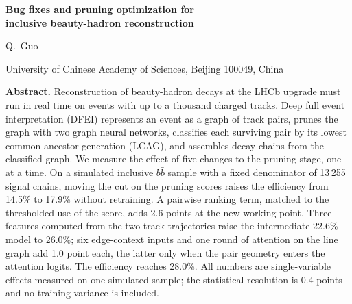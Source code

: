 \documentclass[10pt]{article}
\begin{document}
\begin{center}
{\LARGE\bfseries Bug fixes and pruning optimization for\\[2pt] inclusive beauty-hadron reconstruction\par}
\vspace{0.9em}
{\large Q.~Guo\par}
\vspace{0.35em}
{\small University of Chinese Academy of Sciences, Beijing 100049, China\par}
\end{center}

\vspace{0.3em}
\begin{center}
\begin{minipage}{0.86\textwidth}
\textbf{Abstract.} Reconstruction of beauty-hadron decays at the LHCb upgrade must run in real time on events with up to a thousand charged tracks. Deep full event interpretation (DFEI) represents an event as a graph of track pairs, prunes the graph with two graph neural networks, classifies each surviving pair by its lowest common ancestor generation (LCAG), and assembles decay chains from the classified graph. We measure the effect of five changes to the pruning stage, one at a time. On a simulated inclusive $b\bar b$ sample with a fixed denominator of 13\,255 signal chains, moving the cut on the pruning scores raises the efficiency from 14.5\% to 17.9\% without retraining. A pairwise ranking term, matched to the thresholded use of the score, adds 2.6 points at the new working point. Three features computed from the two track trajectories raise the intermediate 22.6\% model to 26.0\%; six edge-context inputs and one round of attention on the line graph add 1.0 point each, the latter only when the pair geometry enters the attention logits. The efficiency reaches 28.0\%. All numbers are single-variable effects measured on one simulated sample; the statistical resolution is 0.4 points and no training variance is included.
\end{minipage}
\end{center}
\end{document}
